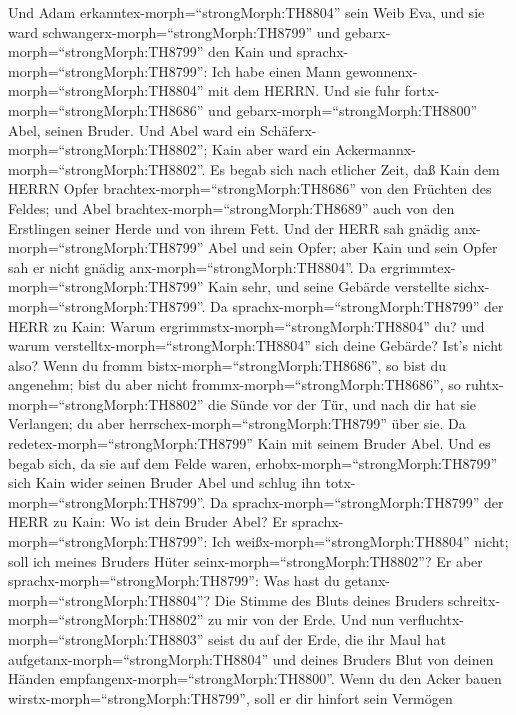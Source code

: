  Und Adam erkanntex-morph=``strongMorph:TH8804'' sein Weib
Eva, und sie ward schwangerx-morph=``strongMorph:TH8799'' und
gebarx-morph=``strongMorph:TH8799'' den Kain und
sprachx-morph=``strongMorph:TH8799'': Ich habe einen Mann
gewonnenx-morph=``strongMorph:TH8804'' mit dem HERRN.  Und
sie fuhr fortx-morph=``strongMorph:TH8686'' und
gebarx-morph=``strongMorph:TH8800'' Abel, seinen Bruder. Und Abel ward
ein Schäferx-morph=``strongMorph:TH8802''; Kain aber ward ein
Ackermannx-morph=``strongMorph:TH8802''.  Es begab sich nach
etlicher Zeit, daß Kain dem HERRN Opfer
brachtex-morph=``strongMorph:TH8686'' von den Früchten des Feldes;
 und Abel brachtex-morph=``strongMorph:TH8689'' auch von den
Erstlingen seiner Herde und von ihrem Fett. Und der HERR sah gnädig
anx-morph=``strongMorph:TH8799'' Abel und sein Opfer;  aber
Kain und sein Opfer sah er nicht gnädig
anx-morph=``strongMorph:TH8804''. Da
ergrimmtex-morph=``strongMorph:TH8799'' Kain sehr, und seine Gebärde
verstellte sichx-morph=``strongMorph:TH8799''.  Da
sprachx-morph=``strongMorph:TH8799'' der HERR zu Kain: Warum
ergrimmstx-morph=``strongMorph:TH8804'' du? und warum
verstelltx-morph=``strongMorph:TH8804'' sich deine Gebärde? 
Ist's nicht also? Wenn du fromm bistx-morph=``strongMorph:TH8686'', so
bist du angenehm; bist du aber nicht
frommx-morph=``strongMorph:TH8686'', so
ruhtx-morph=``strongMorph:TH8802'' die Sünde vor der Tür, und nach dir
hat sie Verlangen; du aber herrschex-morph=``strongMorph:TH8799'' über
sie.  Da redetex-morph=``strongMorph:TH8799'' Kain mit
seinem Bruder Abel. Und es begab sich, da sie auf dem Felde waren,
erhobx-morph=``strongMorph:TH8799'' sich Kain wider seinen Bruder Abel
und schlug ihn totx-morph=``strongMorph:TH8799''.  Da
sprachx-morph=``strongMorph:TH8799'' der HERR zu Kain: Wo ist dein
Bruder Abel? Er sprachx-morph=``strongMorph:TH8799'': Ich
weißx-morph=``strongMorph:TH8804'' nicht; soll ich meines Bruders Hüter
seinx-morph=``strongMorph:TH8802''?  Er aber
sprachx-morph=``strongMorph:TH8799'': Was hast du
getanx-morph=``strongMorph:TH8804''? Die Stimme des Bluts deines Bruders
schreitx-morph=``strongMorph:TH8802'' zu mir von der Erde. 
Und nun verfluchtx-morph=``strongMorph:TH8803'' seist du auf der Erde,
die ihr Maul hat aufgetanx-morph=``strongMorph:TH8804'' und deines
Bruders Blut von deinen Händen empfangenx-morph=``strongMorph:TH8800''.
 Wenn du den Acker bauen
wirstx-morph=``strongMorph:TH8799'', soll er dir hinfort sein Vermögen
